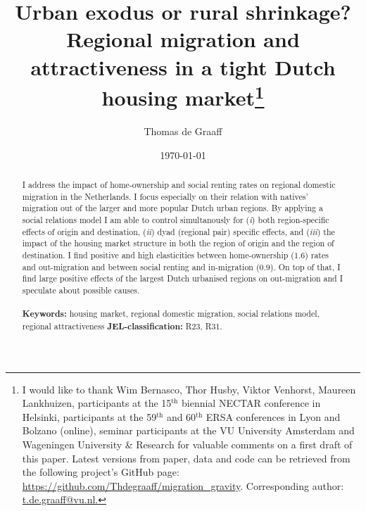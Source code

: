 \documentclass[11pt,parskip,abstracton,notitlepage, dvipsnames]{scrartcl}
\begin{document}
	\title{Urban exodus or rural shrinkage? Regional migration and attractiveness in a tight Dutch housing market\thanks{I would like to thank Wim Bernasco, Thor Husby, 		Viktor Venhorst, Maureen Lankhuizen, participants at the 15$^{\text{th}}$ biennial NECTAR conference in
	Helsinki, participants at the 59$^{\text{th}}$ and 60$^{\text{th}}$ ERSA conferences in Lyon and Bolzano (online), 
	seminar participants at the VU University Amsterdam and Wageningen University \& Research for valuable comments on a
	first draft of this paper. Latest versions from paper, data and code can be retrieved from the
	following project's GitHub page: \href{https://github.com/Thdegraaff/migration_gravity}{https://github.com/Thdegraaff/migration\_gravity}. Corresponding author: \url{t.de.graaff@vu.nl.}} }

	\author[1,2]{\small Thomas de Graaff}
	
	
	\date{\normalsize \today}
	\maketitle
	
	\begin{abstract}
		\noindent I address the impact of home-ownership and social
		renting rates on regional domestic migration in the Netherlands. I focus
		especially on their relation with natives' migration out of the larger and
		more popular Dutch urban regions. By applying a social relations model I
		am able to control simultanously for (\emph{i}) both region-specific effects
		of origin and destination, (\emph{ii}) dyad (regional pair) specific effects,
		and (\emph{iii}) the impact of the housing market structure in both the region
		of origin and the region of destination. I find positive and high elasticities
		between home-ownership ($1.6$) rates and out-migration and between social renting and in-migration ($0.9$).
		On top of that, I find large positive effects of the largest Dutch urbanised regions on out-migration 
		and I speculate about possible causes. 
		\\
		\\
		{\footnotesize \textbf{Keywords:} housing market, regional domestic migration, social relations model, regional attractiveness
			\newline
			\textbf{JEL-classification:} R23, R31.}
	\end{abstract}
	
\end{document}

